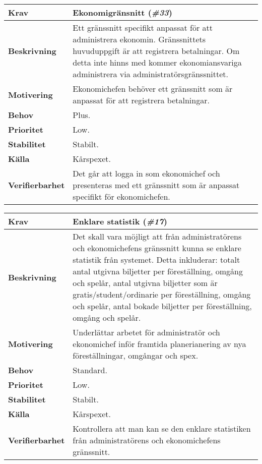 \documentclass[a4paper, twoside, 11pt, titlepage]{article}
\begin{document}
		\begin{tabular} { p{2.6cm} p{12.5cm} }
			\hline
			\sffamily\textbf{Krav} & Ekonomigränsnitt (\emph{\#33})  \\
			\hline
			\sffamily\textbf{Beskrivning} & Ett gränssnitt specifikt anpassat för att administrera ekonomin. Gränssnittets huvuduppgift är att registrera betalningar. Om detta inte hinns med kommer ekonomiansvariga administrera via administratörsgränssnittet.  \\
			\hline
			\sffamily\textbf{Motivering} & Ekonomichefen behöver ett gränssnitt som är anpassat för att registrera betalningar.  \\
			\hline
			\sffamily\textbf{Behov} & Plus.  \\
			\hline
			\sffamily\textbf{Prioritet} & Low.  \\
			\hline
			\sffamily\textbf{Stabilitet} & Stabilt.  \\
			\hline
			\sffamily\textbf{Källa} & Kårspexet.  \\
			\hline
			\sffamily\textbf{Verifierbarhet} & Det går att logga in som ekonomichef och presenteras med ett gränssnitt som är anpassat specifikt för ekonomichefen.  \\
			\hline
		\end{tabular}
		\vspace{6mm}

		\begin{tabular} { p{2.6cm} p{12.5cm} }
			\hline
			\sffamily\textbf{Krav} & Enklare statistik (\emph{\#17})  \\
			\hline
			\sffamily\textbf{Beskrivning} & Det skall vara möjligt att från administratörens och ekonomichefens gränssnitt kunna se enklare statistik från systemet. Detta inkluderar: totalt antal utgivna biljetter per föreställning, omgång och spelår, antal utgivna biljetter som är gratis/student/ordinarie per föreställning, omgång och spelår, antal bokade biljetter per föreställning, omgång och spelår.  \\
			\hline
			\sffamily\textbf{Motivering} & Underlättar arbetet för administratör och ekonomichef inför framtida planerianering av nya föreställningar, omgångar och spex.  \\
			\hline
			\sffamily\textbf{Behov} & Standard.  \\
			\hline
			\sffamily\textbf{Prioritet} & Low.  \\
			\hline
			\sffamily\textbf{Stabilitet} & Stabilt.  \\
			\hline
			\sffamily\textbf{Källa} & Kårspexet.  \\
			\hline
			\sffamily\textbf{Verifierbarhet} & Kontrollera att man kan se den enklare statistiken från administratörens och ekonomichefens gränssnitt.  \\
			\hline
		\end{tabular}
		\vspace{6mm}
\end{document}
